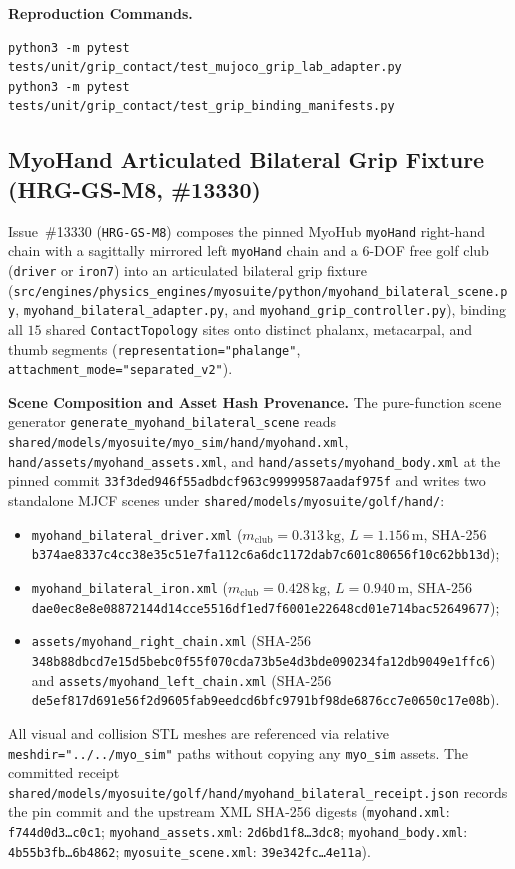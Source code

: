 \documentclass[11pt,a4paper]{article}
\begin{document}
\textbf{Reproduction Commands.}
\begin{verbatim}
python3 -m pytest tests/unit/grip_contact/test_mujoco_grip_lab_adapter.py
python3 -m pytest tests/unit/grip_contact/test_grip_binding_manifests.py
\end{verbatim}

\subsection{MyoHand Articulated Bilateral Grip Fixture (HRG-GS-M8, \#13330)}
\label{sec:hrg-gs-m8-myohand-bilateral}

Issue~\#13330 (\texttt{HRG-GS-M8}) composes the pinned MyoHub \texttt{myoHand} right-hand chain with a sagittally mirrored left \texttt{myoHand} chain and a 6-DOF free golf club (\texttt{driver} or \texttt{iron7}) into an articulated bilateral grip fixture (\texttt{src/engines/physics\_engines/myosuite/python/myohand\_bilateral\_scene.py}, \texttt{myohand\_bilateral\_adapter.py}, and \texttt{myohand\_grip\_controller.py}), binding all $15$ shared \texttt{ContactTopology} sites onto distinct phalanx, metacarpal, and thumb segments (\texttt{representation="phalange"}, \texttt{attachment\_mode="separated\_v2"}).

\textbf{Scene Composition and Asset Hash Provenance.}
The pure-function scene generator \texttt{generate\_myohand\_bilateral\_scene} reads \texttt{shared/models/myosuite/myo\_sim/hand/myohand.xml}, \texttt{hand/assets/myohand\_assets.xml}, and \texttt{hand/assets/myohand\_body.xml} at the pinned commit \texttt{33f3ded946f55adbdcf963c99999587aadaf975f} and writes two standalone MJCF scenes under \texttt{shared/models/myosuite/golf/hand/}:
\begin{itemize}
  \item \texttt{myohand\_bilateral\_driver.xml} ($m_{\mathrm{club}} = 0.313\,\mathrm{kg}$, $L = 1.156\,\mathrm{m}$, SHA-256 \texttt{b374ae8337c4cc38e35c51e7fa112c6a6dc1172dab7c601c80656f10c62bb13d});
  \item \texttt{myohand\_bilateral\_iron.xml} ($m_{\mathrm{club}} = 0.428\,\mathrm{kg}$, $L = 0.940\,\mathrm{m}$, SHA-256 \texttt{dae0ec8e8e08872144d14cce5516df1ed7f6001e22648cd01e714bac52649677});
  \item \texttt{assets/myohand\_right\_chain.xml} (SHA-256 \texttt{348b88dbcd7e15d5bebc0f55f070cda73b5e4d3bde090234fa12db9049e1ffc6}) and \texttt{assets/myohand\_left\_chain.xml} (SHA-256 \texttt{de5ef817d691e56f2d9605fab9eedcd6bfc9791bf98de6876cc7e0650c17e08b}).
\end{itemize}
All visual and collision STL meshes are referenced via relative \texttt{meshdir="../../myo\_sim"} paths without copying any \texttt{myo\_sim} assets. The committed receipt \texttt{shared/models/myosuite/golf/hand/myohand\_bilateral\_receipt.json} records the pin commit and the upstream XML SHA-256 digests (\texttt{myohand.xml}: \texttt{f744d0d3\ldots c0c1}; \texttt{myohand\_assets.xml}: \texttt{2d6bd1f8\ldots 3dc8}; \texttt{myohand\_body.xml}: \texttt{4b55b3fb\ldots 6b4862}; \texttt{myosuite\_scene.xml}: \texttt{39e342fc\ldots 4e11a}).
\end{document}
